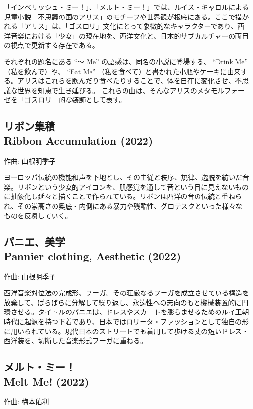 \documentclass[a6paper, 9pt, openright, titlepage, twoside]{ltjsarticle}
\begin{document}
「インベリッシュ・ミー！」、「メルト・ミー！」では、ルイス・キャロルによる児童小説「不思議の国のアリス」のモチーフや世界観が根底にある。ここで描かれる「アリス」は、「ゴスロリ」文化にとって象徴的なキャラクターであり、西洋音楽における「少女」の現在地を、西洋文化と、日本的サブカルチャーの両目の視点で更新する存在である。 

それぞれの題名にある ``～ Me'' の語感は、同名の小説に登場する、 ``Drink Me'' （私を飲んで）や、 ``Eat Me'' （私を食べて）と書かれた小瓶やケーキに由来する。アリスはこれらを飲んだり食べたりすることで、体を自在に変化させ、不思議な世界を知恵で生き延びる。 これらの曲は、そんなアリスのメタモルフォーゼを「ゴスロリ」的な装飾として表す。

\subsection*{
リボン集積 \\
Ribbon Accumulation (2022) }\label{ribbon}
{\small 作曲: 山根明季子}

ヨーロッパ伝統の機能和声を下地とし、その主従と秩序、規律、逸脱を紡いだ音楽。リボンという少女的アイコンを、肌感覚を通して音という目に見えないものに抽象化し延々と描くことで作られている。リボンは西洋の音の伝統と重ねられ、その崇高さの奥底・内側にある暴力や残酷性、グロテスクといった様々なものを反芻していく。


\subsection*{
パニエ、美学 \\
Pannier clothing, Aesthetic (2022) }\label{pannier}
{\small 作曲: 山根明季子}

西洋音楽対位法の完成形、フーガ。その荘厳なるフーガを成立させている構造を放棄して、ばらばらに分解して繰り返し、永遠性への志向のもと機械装置的に円環させる。タイトルのパニエは、ドレスやスカートを膨らませるためのルイ王朝時代に起源を持つ下着であり、日本ではロリータ・ファッションとして独自の形に用いられている。現代日本のストリートでも着用して歩ける丈の短いドレス・西洋装を、切断した音楽形式フーガに重ねる。 



\subsection*{
メルト・ミー！ \\
Melt Me! (2022) }\label{melt}
{\small 作曲: 梅本佑利}
\end{document}
